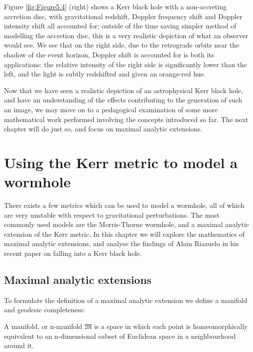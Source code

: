 \documentclass[oneside,openright,frontopenright, singlespacing]{dmathesis}
\begin{document}
\vspace{1em}
	Figure \ref{fig:Figure5.4} (right) shows a Kerr black hole with a non-accreting accretion disc, with gravitational redshift, Doppler frequency shift and Doppler intensity shift all accounted for; outside of the time saving simpler method of modelling the accretion disc, this is a very realistic depiction of what an observer would see. We see that on the right side, due to the retrograde orbits near the shadow of the event horizon, Doppler shift is accounted for is both its applications: the relative intensity of the right side is significantly lower than the left, and the light is subtly redshifted and given an orange-red hue.

\vspace{1em}
	Now that we have seen a realistic depiction of an astrophysical Kerr black hole, and have an understanding of the effects contributing to the generation of such an image, we may move on to a pedagogical examination of some more mathematical work performed involving the concepts introduced so far. The next chapter will do just so, and focus on maximal analytic extensions.




\chapter{Using the Kerr metric to model a wormhole}\label{chap:Chapter6}

	There exists a few metrics which can be used to model a wormhole, all of which are very unstable with respect to gravitational perturbations. The most commonly used models are the Morris-Thorne wormhole, and a maximal analytic extension of the Kerr metric. In this chapter we will explore the mathematics of maximal analytic extensions, and analyse the findings of Alain Riazuelo in his recent paper on falling into a Kerr black hole\cite{seeingRelativity}.

\section{Maximal analytic extensions}\label{sec:Section6.1}

	To formulate the definition of a maximal analytic extension we define a manifold and geodesic completeness:

\vspace{1em}
	A manifold, or n-manifold $\mathfrak{M}$ is a space in which each point is homeomorphically equivalent to an n-dimensional subset of Euclidean space in a neighbourhood around it.
\end{document}
